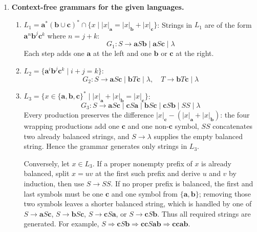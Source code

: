 \begin{enumerate}[{8.}1. ]
But $\pmb{abc}\notin L(G)$.  In the grammar $G$, after one use of
$S\to\pmb{a}SB\pmb{c}$ the only way to remove the remaining $S$ is
$S\to\lambda$, which gives
\[
\pmb{a}B\pmb{c}.
\]
That sentential form is stuck: there is no occurrence of $SB$ to which
$SB\to\pmb{b}S$ can be applied, and there is no occurrence of $\pmb{c}B$ to
which $\pmb{c}B\to B\pmb{c}$ can be applied.  Hence no derivation in $G$
produces $\pmb{abc}$.

Therefore
\[
\pmb{abc}\in L(G'')\setminus L(G),
\]
so $G$ is not equivalent to $G''$.

\item \textbf{Context-free grammars for the given languages.}

\begin{enumerate}
\item $L_1 = \pmb{a}^*(\pmb{b}\cup\pmb{c})^* \cap \{x \mid |x|_{\pmb{a}} = |x|_{\pmb{b}} + |x|_{\pmb{c}}\}$:
Strings in $L_1$ are of the form $\pmb{a}^n\pmb{b}^j\pmb{c}^k$ where $n = j+k$:
\[
G_1: S \to \pmb{a}S\pmb{b} \mid \pmb{a}S\pmb{c} \mid \lambda
\]
Each step adds one $\pmb{a}$ at the left and one $\pmb{b}$ or $\pmb{c}$ at the right.

\item $L_2 = \{\pmb{a}^i\pmb{b}^j\pmb{c}^k \mid i+j=k\}$:
\[
G_2: S \to \pmb{a}S\pmb{c} \mid \pmb{b}T\pmb{c} \mid \lambda, \quad T \to \pmb{b}T\pmb{c} \mid \lambda
\]

\item $L_3 = \{x \in \{\pmb{a},\pmb{b},\pmb{c}\}^* \mid |x|_{\pmb{a}} + |x|_{\pmb{b}} = |x|_{\pmb{c}}\}$:
\[
G_3: S \to \pmb{a}S\pmb{c} \mid \pmb{c}S\pmb{a}
      \mid \pmb{b}S\pmb{c} \mid \pmb{c}S\pmb{b}
      \mid SS \mid \lambda
\]
Every production preserves the difference
$|x|_{\pmb{c}}-(|x|_{\pmb{a}}+|x|_{\pmb{b}})$: the four wrapping productions add
one $\pmb{c}$ and one non-$\pmb{c}$ symbol, $SS$ concatenates two already
balanced strings, and $S\to\lambda$ supplies the empty balanced string.  Hence
the grammar generates only strings in $L_3$.

Conversely, let $x\in L_3$.  If a proper nonempty prefix of $x$ is already
balanced, split $x=uv$ at the first such prefix and derive $u$ and $v$ by
induction, then use $S\to SS$.  If no proper prefix is balanced, the first and
last symbols must be one $\pmb{c}$ and one symbol from
$\{\pmb{a},\pmb{b}\}$; removing those two symbols leaves a shorter balanced
string, which is handled by one of
$S\to \pmb{a}S\pmb{c}$, $S\to \pmb{b}S\pmb{c}$,
$S\to \pmb{c}S\pmb{a}$, or $S\to \pmb{c}S\pmb{b}$.  Thus all required strings
are generated.  For example,
$S\Rightarrow \pmb{c}S\pmb{b}\Rightarrow \pmb{cc}S\pmb{ab}
\Rightarrow \pmb{ccab}$.
\end{enumerate}


\end{enumerate}
